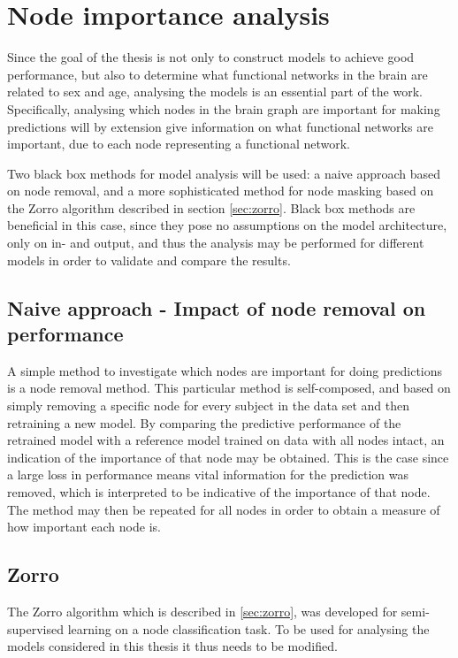 \section{Node importance analysis}
Since the goal of the thesis is not only to construct models to achieve good performance, but also to determine what functional networks in the brain are related to sex and age, analysing the models is an essential part of the work. Specifically, analysing which nodes in the brain graph are important for making predictions will by extension give information on what functional networks are important, due to each node representing a functional network. 

Two black box methods for model analysis will be used: a naive approach based on node removal, and a more sophisticated method for node masking based on the Zorro algorithm described in section \ref{sec:zorro}. Black box methods are beneficial in this case, since they pose no assumptions on the model architecture, only on in- and output, and thus the analysis may be performed for different models in order to validate and compare the results. 

\subsection{Naive approach - Impact of node removal on performance}
A simple method to investigate which nodes are important for doing predictions is a node removal method. This particular method is self-composed, and based on simply removing a specific node for every subject in the data set and then retraining a new model. By comparing the predictive performance of the retrained model with a reference model trained on data with all nodes intact, an indication of the importance of that node may be obtained. This is the case since a large loss in performance means vital information for the prediction was removed, which is interpreted to be indicative of the importance of that node. The method may then be repeated for all nodes in order to obtain a measure of how important each node is.

\subsection{Zorro}

The Zorro algorithm which is described in \ref{sec:zorro}, was developed for semi-supervised learning on a node classification task. To be used for analysing the models considered in this thesis it thus needs to be modified.


